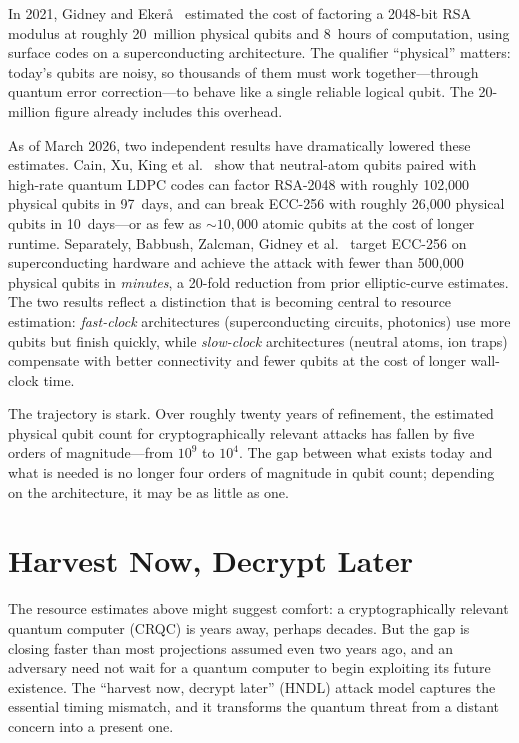 \begin{example}
\label{ex:resource-estimates}
In 2021, Gidney and Eker\r{a}~\cite{GidneyEkera2021} estimated the cost of factoring a 2048-bit RSA modulus at roughly 20~million physical qubits and 8~hours of computation, using surface codes on a superconducting architecture.  The qualifier ``physical'' matters: today's qubits are noisy, so thousands of them must work together---through quantum error correction---to behave like a single reliable logical qubit.  The 20-million figure already includes this overhead.

As of March 2026, two independent results have dramatically lowered these estimates.  Cain, Xu, King et al.~\cite{CainXuKing2026} show that neutral-atom qubits paired with high-rate quantum LDPC codes can factor RSA-2048 with roughly 102{,}000 physical qubits in 97~days, and can break ECC-256 with roughly 26{,}000 physical qubits in 10~days---or as few as ${\sim}10{,}000$ atomic qubits at the cost of longer runtime.  Separately, Babbush, Zalcman, Gidney et al.~\cite{BabbushZalcmanGidney2026} target ECC-256 on superconducting hardware and achieve the attack with fewer than 500{,}000 physical qubits in \emph{minutes}, a 20-fold reduction from prior elliptic-curve estimates.  The two results reflect a distinction that is becoming central to resource estimation: \emph{fast-clock} architectures (superconducting circuits, photonics) use more qubits but finish quickly, while \emph{slow-clock} architectures (neutral atoms, ion traps) compensate with better connectivity and fewer qubits at the cost of longer wall-clock time.

The trajectory is stark.  Over roughly twenty years of refinement, the estimated physical qubit count for cryptographically relevant attacks has fallen by five orders of magnitude---from $10^9$ to $10^4$.  The gap between what exists today and what is needed is no longer four orders of magnitude in qubit count; depending on the architecture, it may be as little as one.
\end{example}


\section{Harvest Now, Decrypt Later}
\label{sec:hndl}

The resource estimates above might suggest comfort: a cryptographically relevant quantum computer (CRQC) is years away, perhaps decades.  But the gap is closing faster than most projections assumed even two years ago, and an adversary need not wait for a quantum computer to begin exploiting its future existence.  The ``harvest now, decrypt later'' (HNDL) attack model captures the essential timing mismatch, and it transforms the quantum threat from a distant concern into a present one.

